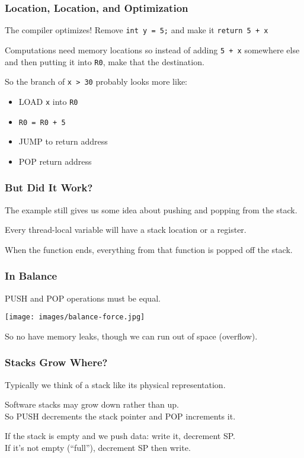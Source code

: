 \begin{frame}
\frametitle{Location, Location, and Optimization}

The compiler optimizes! Remove \texttt{int y = 5;} and make it \texttt{return 5 + x}

	
Computations need memory locations so instead of adding \texttt{5 + x} somewhere else and then putting it into \texttt{R0}, make that the destination.

So the branch of \texttt{x > 30} probably looks more like:
\begin{itemize}
	\item LOAD \texttt{x} into \texttt{R0}
	\item \texttt{R0 = R0 + 5}
	\item JUMP to return address
	\item POP return address
\end{itemize}

\end{frame}


\begin{frame}
\frametitle{But Did It Work?}

The example still gives us some idea about pushing and popping from the stack.

Every thread-local variable will have a stack location or a register.

When the function ends, everything  from that function is popped off the stack. 

\end{frame}


\begin{frame}
\frametitle{In Balance}

PUSH and POP operations must be equal. 

\begin{center}
	\texttt{[image: images/balance-force.jpg]}
\end{center}

So no have memory leaks, though we can run out of space (overflow).

\end{frame}


\begin{frame}
\frametitle{Stacks Grow Where?}

Typically we think of a stack like its physical representation.

Software stacks may grow down rather than up.\\
\quad So PUSH decrements the stack pointer and POP increments it.

If the stack is empty and we push data: write it, decrement SP.\\
\quad If it's not empty (``full''), decrement SP then write.

\end{frame}



